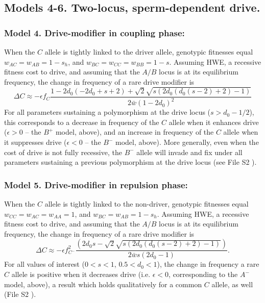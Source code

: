 \documentclass[12pt,letterpaper]{article}
\begin{document}
\subsection*{Models 4-6. Two-locus, sperm-dependent drive.} 

\subsubsection*{Model 4. Drive-modifier in coupling phase:}
When the $C$ allele is tightly linked to the driver allele, 
	genotypic fitnesses equal $w_{AC}=w_{AB}=1-s_h$, and $w_{BC}=w_{CC}=w_{BB}=1-s$. 
Assuming HWE, a recessive fitness cost to drive, and assuming that the $A/B$ locus is at its equilibrium frequency, the change in frequency of a rare drive modifier is
\begin{equation}
	\Delta C\approx -\epsilon f_C \frac{ 1-2 d_0 (-2 d_0+s+2)+\sqrt{2} \sqrt{s (2 d_0 (d_0(s-2)+2)-1)}}{2 \bar{w}(1-2 d_0)^2}
	\label{coupling}
\end{equation}
For all parameters sustaining a polymorphism at the drive locus ($s>d_0-1/2$), this corresponds to a decrease in frequency of the $C$ allele when it enhances drive ($\epsilon >0$ -- the $B^+$ model, above), 
	and an increase in frequency of the $C$ allele when it suppresses drive ($\epsilon <0$ -- the $B^-$ model, above). 
More generally, even when the cost of drive is not fully recessive, the $B^-$ allele will invade and fix under all parameters sustaining a previous polymorphism at the drive locus (see File S2  ). 


\subsubsection*{Model 5. Drive-modifier in repulsion phase:}
When the $C$ allele is tightly linked to the non-driver, 
	genotypic fitnesses equal $w_{CC}=w_{AC}=w_{AA}=1$, and $w_{BC}=w_{AB}=1-s_h$. 
Assuming HWE, a recessive fitness cost to drive, and assuming that the $A/B$ locus is at its equilibrium frequency, the change in frequency of a rare drive modifier is
\begin{equation}
	\Delta C \approx -\epsilon f_{C^-}^2 \frac{ \left(2 d_0 s-\sqrt{2} \sqrt{s (2 d_0 (d_0 (s-2)+2)-1)}\right)}{2\bar{w}s (2 d_0 -1) }. \label{A-}
\end{equation}
For all values of interest ($0<s<1$, $0.5<d_0<1$), the change in frequency a rare $C$ allele is positive when it decreases drive (i.e. $\epsilon <0$, corresponding to the $A^-$ model, above), a result which holds qualitatively for a common $C$ allele, as well (File S2  ). 
\end{document}
